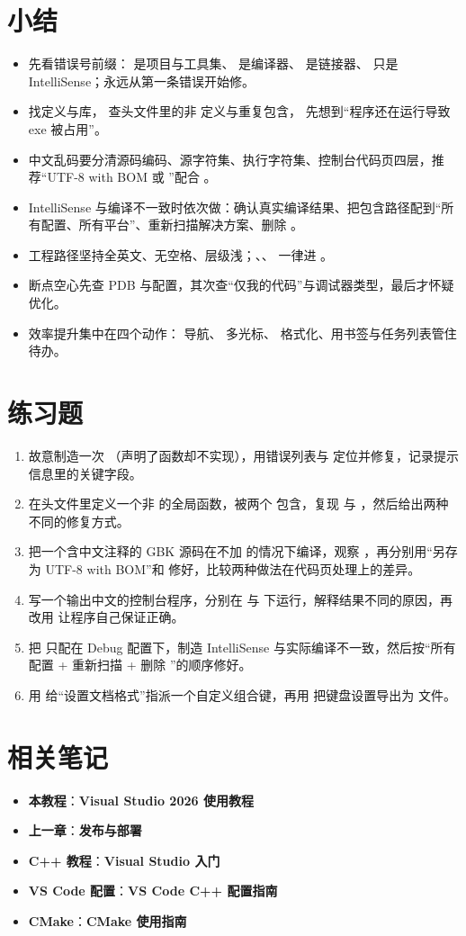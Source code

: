 \section{小结}
\begin{itemize}
  \item 先看错误号前缀： 是项目与工具集、 是编译器、 是链接器、 只是 IntelliSense；永远从第一条错误开始修。
  \item {} 找定义与库， 查头文件里的非  定义与重复包含， 先想到“程序还在运行导致 exe 被占用”。
  \item 中文乱码要分清源码编码、源字符集、执行字符集、控制台代码页四层，推荐“UTF-8 with BOM 或 ”配合 。
  \item IntelliSense 与编译不一致时依次做：确认真实编译结果、把包含路径配到“所有配置、所有平台”、重新扫描解决方案、删除 。
  \item 工程路径坚持全英文、无空格、层级浅；、、 一律进 。
  \item 断点空心先查 PDB 与配置，其次查“仅我的代码”与调试器类型，最后才怀疑优化。
  \item 效率提升集中在四个动作： 导航、 多光标、 格式化、用书签与任务列表管住待办。
\end{itemize}
\section{练习题}
\begin{enumerate}
  \item 故意制造一次 （声明了函数却不实现），用错误列表与  定位并修复，记录提示信息里的关键字段。
  \item 在头文件里定义一个非  的全局函数，被两个  包含，复现  与 ，然后给出两种不同的修复方式。
  \item 把一个含中文注释的 GBK 源码在不加  的情况下编译，观察 ，再分别用“另存为 UTF-8 with BOM”和  修好，比较两种做法在代码页处理上的差异。
  \item 写一个输出中文的控制台程序，分别在  与  下运行，解释结果不同的原因，再改用  让程序自己保证正确。
  \item 把  只配在 Debug 配置下，制造 IntelliSense 与实际编译不一致，然后按“所有配置 + 重新扫描 + 删除 ”的顺序修好。
  \item 用  给“设置文档格式”指派一个自定义组合键，再用  把键盘设置导出为  文件。
\end{enumerate}
\section{相关笔记}
\begin{itemize}
  \item \textbf{本教程}：\textbf{Visual Studio 2026 使用教程}
  \item \textbf{上一章}：\textbf{发布与部署}
  \item \textbf{C++ 教程}：\textbf{Visual Studio 入门}
  \item \textbf{VS Code 配置}：\textbf{VS Code C++ 配置指南}
  \item \textbf{CMake}：\textbf{CMake 使用指南}
\end{itemize}
